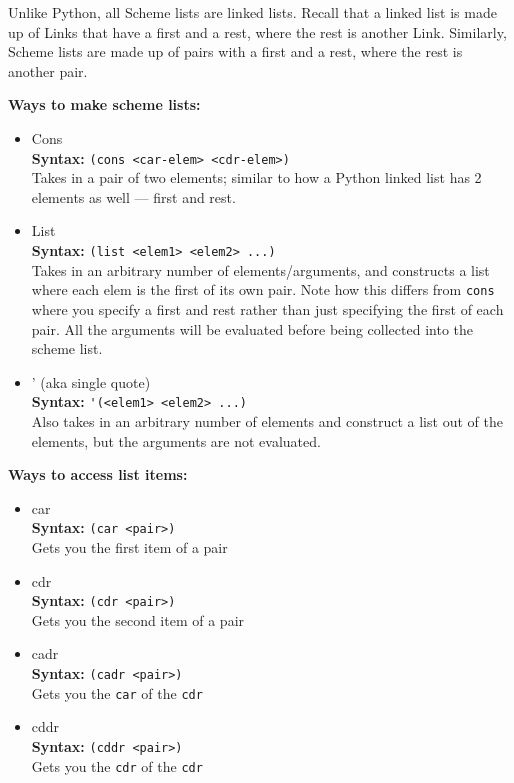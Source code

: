 Unlike Python, all Scheme lists are linked lists. Recall that a linked list is made up of Links that have a first and a rest, where the rest is another Link. Similarly, Scheme lists are made up of pairs with a first and a rest, where the rest is another pair.

\textbf{Ways to make scheme lists:}
\begin{itemize}
\item Cons \\
\textbf{Syntax:} \lstinline{(cons <car-elem> <cdr-elem>)} \\
Takes in a pair of two elements; similar to how a Python linked list has 2 elements as well --- first and rest.
\item List \\
\textbf{Syntax:} \lstinline{(list <elem1> <elem2> ...)} \\
Takes in an arbitrary number of elements/arguments, and constructs a list where each elem is the first of its own pair. Note how this differs from \lstinline{cons} where you specify a first and rest rather than just specifying the first of each pair. All the arguments will be evaluated before being collected into the scheme list.
\item ' (aka single quote) \\
\textbf{Syntax:} \lstinline{'(<elem1> <elem2> ...)} \\
Also takes in an arbitrary number of elements and construct a list out of the elements, but the arguments are not evaluated.
\end{itemize}

\textbf{Ways to access list items:}
\begin{itemize}
\item car \\
\textbf{Syntax:} \lstinline{(car <pair>)} \\
Gets you the first item of a pair
\item cdr \\
\textbf{Syntax:} \lstinline{(cdr <pair>)} \\
Gets you the second item of a pair
\end{itemize}
\begin{itemize}
\item cadr \\
\textbf{Syntax:} \lstinline{(cadr <pair>)} \\
Gets you the \lstinline{car} of the \lstinline{cdr}
\end{itemize}
\begin{itemize}
\item cddr \\
\textbf{Syntax:} \lstinline{(cddr <pair>)} \\
Gets you the \lstinline{cdr} of the \lstinline{cdr}
\end{itemize}
